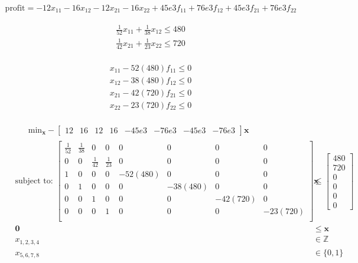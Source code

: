 \documentclass{article}
\begin{document}
\begin{align*}
    \text{profit} = -12x_{11} - 16x_{12} - 12x_{21} - 16x_{22} + 45e3f_{11} + 76e3f_{12} + 45e3f_{21} + 76e3f_{22}
\end{align*}

\begin{align*}
    \frac{1}{52}x_{11} + \frac{1}{38}x_{12} \le 480\\
    \frac{1}{42}x_{21} + \frac{1}{23}x_{22} \le 720\\
\end{align*}

\begin{align*}
    x_{11} - 52\left(480\right)f_{11} \le 0\\
    x_{12} - 38\left(480\right)f_{12} \le 0\\
    x_{21} - 42\left(720\right)f_{21} \le 0\\
    x_{22} - 23\left(720\right)f_{22} \le 0\\
\end{align*}

\begin{align*}
    &\qquad \text{min}_{\mathbf{x}} -\begin{bmatrix} 12 & 16 & 12 & 16 & -45e3 & -76e3 & -45e3 & -76e3 \end{bmatrix} \mathbf{x} \\
    &\begin{aligned}
    \mbox{subject to: } \begin{bmatrix} \frac{1}{52} & \frac{1}{38} & 0 & 0 & 0 & 0 & 0 & 0\\
                                         0 & 0 & \frac{1}{42} & \frac{1}{23}  & 0 & 0 & 0 & 0\\
                                         1 & 0 & 0 & 0 & -52\left(480\right) & 0 & 0 & 0\\
                                         0 & 1 & 0 & 0 & 0 & -38\left(480\right)  & 0 & 0\\
                                         0 & 0 & 1 & 0 & 0 & 0 & -42\left(720\right) & 0 \\
                                         0 & 0 & 0 & 1 & 0 & 0 & 0 & -23\left(720\right) \\
                         \end{bmatrix} \mathbf{x} &\le
                         \begin{bmatrix} 480 \\ 720 \\ 0 \\ 0 \\ 0 \\ 0 \end{bmatrix} \\
                        \mathbf{0} &\le \mathbf{x}\\
                        x_{1,2,3,4} &\in \mathbb{Z}\\
                        x_{5,6,7,8} &\in \{0,1\}\\
    \end{aligned}
\end{align*}
\end{document}
